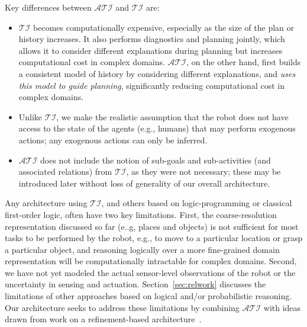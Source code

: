 \documentclass[letterpaper, 10 pt, conference]{article}  %
\begin{document}
Key differences between $\mathcal{ATI}$ and $\mathcal{TI}$ are:
\begin{itemize}
\item $\mathcal{TI}$ becomes computationally expensive, especially as
  the size of the plan or history increases. It also performs
  diagnostics and planning jointly, which allows it to consider
  different explanations during planning but increases computational
  cost in complex domains. $\mathcal{ATI}$, on the other hand, first
  builds a consistent model of history by considering different
  explanations, and \emph{uses this model to guide planning},
  significantly reducing computational cost in complex domains.
\item Unlike $\mathcal{TI}$, we make the realistic assumption that the
  robot does not have access to the state of the agents (e.g., humans)
  that may perform exogenous actions; any exogenous actions can only
  be inferred.
\item $\mathcal{ATI}$ does not include the notion of sub-goals and
  sub-activities (and associated relations) from $\mathcal{TI}$, as
  they were not necessary; these may be introduced later without loss
  of generality of our overall architecture.
\end{itemize}
Any architecture using $\mathcal{TI}$, and others based on
logic-programming or classical first-order logic, often have two key
limitations. First, the coarse-resolution representation discussed so
far (e..g, places and objects) is not sufficient for most tasks to be
performed by the robot, e.g., to move to a particular location or
grasp a particular object, and reasoning logically over a more
fine-grained domain representation will be computationally intractable
for complex domains. Second, we have not yet modeled the actual
sensor-level observations of the robot or the uncertainty in sensing
and actuation. Section~\ref{sec:relwork} discusses the limitations of
other approaches based on logical and/or probabilistic reasoning. Our
architecture seeks to address these limitations by combining
$\mathcal{ATI}$ with ideas drawn from work on a refinement-based
architecture~\cite{sridharan2017refinement}.
\end{document}
